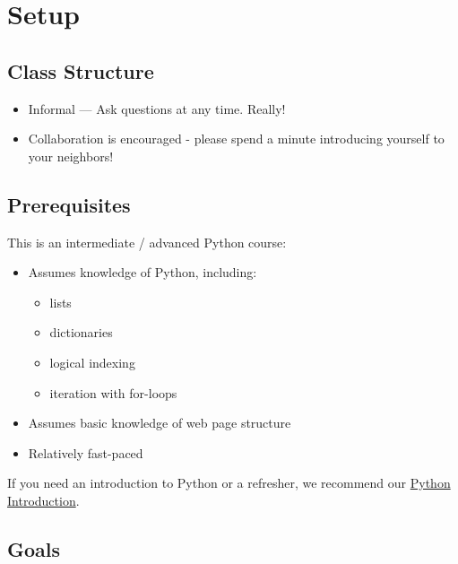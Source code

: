 \documentclass[
]{book}
\providecommand{\tightlist}{%
  \setlength{\itemsep}{0pt}\setlength{\parskip}{0pt}}
\begin{document}
\hypertarget{setup-5}{%
\section{Setup}\label{setup-5}}

\hypertarget{class-structure-5}{%
\subsection{Class Structure}\label{class-structure-5}}

\begin{itemize}
\tightlist
\item
  Informal --- Ask questions at any time. Really!
\item
  Collaboration is encouraged - please spend a minute introducing yourself to your neighbors!
\end{itemize}

\hypertarget{prerequisites-5}{%
\subsection{Prerequisites}\label{prerequisites-5}}

This is an intermediate / advanced Python course:

\begin{itemize}
\tightlist
\item
  Assumes knowledge of Python, including:

  \begin{itemize}
  \tightlist
  \item
    lists
  \item
    dictionaries
  \item
    logical indexing
  \item
    iteration with for-loops
  \end{itemize}
\item
  Assumes basic knowledge of web page structure
\item
  Relatively fast-paced
\end{itemize}

If you need an introduction to Python or a refresher, we recommend our
\href{https://iqss.github.io/dss-workshops/PythonIntro.html}{Python Introduction}.

\hypertarget{goals-4}{%
\subsection{Goals}\label{goals-4}}
\end{document}
